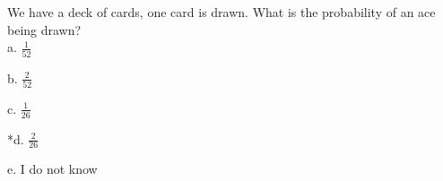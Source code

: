 
We have a deck of cards, one card is drawn. What is the probability
of an ace being drawn? \\

a. \(\frac{1}{52}\)

b. \(\frac{2}{52}\)

c. \(\frac{1}{26}\)

*d. \(\frac{2}{26}\)

e. I do not know \\
